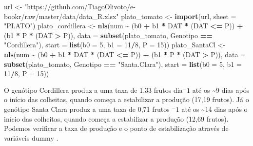 \documentclass[
]{book}
\newenvironment{Shaded}{\begin{snugshade}}{\end{snugshade}}
\newcommand{\DataTypeTok}[1]{\textcolor[rgb]{0.13,0.29,0.53}{#1}}
\newcommand{\DecValTok}[1]{\textcolor[rgb]{0.00,0.00,0.81}{#1}}
\newcommand{\KeywordTok}[1]{\textcolor[rgb]{0.13,0.29,0.53}{\textbf{#1}}}
\newcommand{\NormalTok}[1]{#1}
\newcommand{\OperatorTok}[1]{\textcolor[rgb]{0.81,0.36,0.00}{\textbf{#1}}}
\newcommand{\StringTok}[1]{\textcolor[rgb]{0.31,0.60,0.02}{#1}}
\numberwithin{equation}{section}
\newcommand{\indt}[1]{\index{#1|ST}}
\begin{document}
\begin{Shaded}
\begin{Highlighting}[]
\NormalTok{url \textless{}{-}}\StringTok{ "https://github.com/TiagoOlivoto/e{-}bookr/raw/master/data/data\_R.xlsx"}
\NormalTok{plato\_tomato \textless{}{-}}\StringTok{ }\KeywordTok{import}\NormalTok{(url, }\DataTypeTok{sheet =} \StringTok{"PLATO"}\NormalTok{)}
\NormalTok{plato\_cordillera \textless{}{-}}\StringTok{ }
\StringTok{  }\KeywordTok{nls}\NormalTok{(num }\OperatorTok{\textasciitilde{}}\StringTok{ }\NormalTok{(b0 }\OperatorTok{+}\StringTok{ }\NormalTok{b1 }\OperatorTok{*}\StringTok{ }\NormalTok{DAT }\OperatorTok{*}\StringTok{ }\NormalTok{(DAT }\OperatorTok{\textless{}=}\StringTok{ }\NormalTok{P)) }\OperatorTok{+}\StringTok{ }\NormalTok{(b1 }\OperatorTok{*}\StringTok{ }\NormalTok{P }\OperatorTok{*}\StringTok{ }\NormalTok{(DAT }\OperatorTok{\textgreater{}}\StringTok{ }\NormalTok{P)),}
      \DataTypeTok{data =} \KeywordTok{subset}\NormalTok{(plato\_tomato, Genotipo }\OperatorTok{==}\StringTok{ "Cordillera"}\NormalTok{),}
      \DataTypeTok{start =} \KeywordTok{list}\NormalTok{(}\DataTypeTok{b0 =} \DecValTok{5}\NormalTok{, }\DataTypeTok{b1 =} \DecValTok{11}\OperatorTok{/}\DecValTok{8}\NormalTok{, }\DataTypeTok{P =} \DecValTok{15}\NormalTok{))}
\NormalTok{plato\_SantaCl \textless{}{-}}\StringTok{ }
\StringTok{  }\KeywordTok{nls}\NormalTok{(num }\OperatorTok{\textasciitilde{}}\StringTok{ }\NormalTok{(b0 }\OperatorTok{+}\StringTok{ }\NormalTok{b1 }\OperatorTok{*}\StringTok{ }\NormalTok{DAT }\OperatorTok{*}\StringTok{ }\NormalTok{(DAT }\OperatorTok{\textless{}=}\StringTok{ }\NormalTok{P)) }\OperatorTok{+}\StringTok{ }\NormalTok{(b1 }\OperatorTok{*}\StringTok{ }\NormalTok{P }\OperatorTok{*}\StringTok{ }\NormalTok{(DAT }\OperatorTok{\textgreater{}}\StringTok{ }\NormalTok{P)),}
      \DataTypeTok{data =} \KeywordTok{subset}\NormalTok{(plato\_tomato, Genotipo }\OperatorTok{==}\StringTok{ "Santa.Clara"}\NormalTok{),}
      \DataTypeTok{start =} \KeywordTok{list}\NormalTok{(}\DataTypeTok{b0 =} \DecValTok{5}\NormalTok{, }\DataTypeTok{b1 =} \DecValTok{11}\OperatorTok{/}\DecValTok{8}\NormalTok{, }\DataTypeTok{P =} \DecValTok{15}\NormalTok{))}
\end{Highlighting}
\end{Shaded}

O genótipo Cordillera produz a uma taxa de 1,33 frutos dia\(^-1\) até os \textasciitilde9 dias após o início das colheitas, quando começa a estabilizar a produção (17,19 frutos). Já o genótipo Santa Clara produz a uma taxa de 0,71 frutos \(^-1\) até os \textasciitilde14 dias após o início das colheitas, quando começa a estabilizar a produção (12,69 frutos). Podemos verificar a taxa de produção e o ponto de estabilização através de variáveis dummy \indt{variáveis dummy}.
\end{document}
